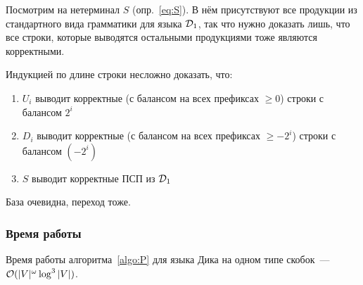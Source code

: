 Посмотрим на нетерминал $S$ (опр.~\ref{eq:S}). В нём присутствуют все продукции из стандартного вида грамматики для языка $\mathcal{D}_1$, так что нужно доказать лишь, что все строки, которые выводятся остальными продукциями тоже являются корректными. 

Индукцией по длине строки несложно доказать, что:

\vspace{-\topsep}
\begin{enumerate}
  \setlength\itemsep{-0.1em}
  \item $U_i$ выводит корректные (с балансом на всех префиксах $\ge 0$) строки с балансом $2^{i}$
  \item $D_i$ выводит корректные (с балансом на всех префиксах $\ge -2^{i}$) строки с балансом $(-2^{i})$
  \item $S$ выводит корректные ПСП из $\mathcal{D}_1$
\end{enumerate}

База очевидна, переход тоже.

\subsubsection{Время работы}

\begin{theorem}
  Время работы алгоритма~\ref{algo:P} для языка Дика на одном типе скобок~--- $\mathcal{O}(|V|^{\omega} \log^3 |V|)$.
\end{theorem}

